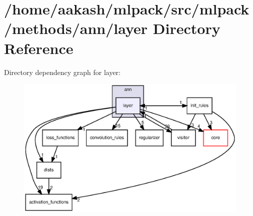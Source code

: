 \section{/home/aakash/mlpack/src/mlpack/methods/ann/layer Directory Reference}
\label{dir_104798ce316d01262d69b00f4c94ed15}
Directory dependency graph for layer\+:
\nopagebreak
\begin{figure}[H]
\begin{center}
\leavevmode
\includegraphics[width=350pt]{dir_104798ce316d01262d69b00f4c94ed15_dep}
\end{center}
\end{figure}
